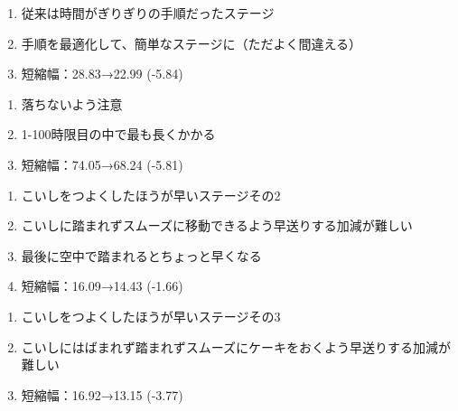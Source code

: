 \begin{enumerate}[label={\sarrow}]
\item 従来は時間がぎりぎりの手順だったステージ
\item 手順を最適化して、簡単なステージに（ただよく間違える）
\item 短縮幅：28.83→22.99 (-5.84)
\end{enumerate}



\begin{enumerate}[label={\sarrow}]
\item 落ちないよう注意
\item 1-100時限目の中で最も長くかかる
\item 短縮幅：74.05→68.24 (-5.81)
\end{enumerate}



\begin{enumerate}[label={\sarrow}]
\item こいしをつよくしたほうが早いステージその2
\item こいしに踏まれずスムーズに移動できるよう早送りする加減が難しい
\item 最後に空中で踏まれるとちょっと早くなる
\item 短縮幅：16.09→14.43 (-1.66)
\end{enumerate}



\begin{enumerate}[label={\sarrow}]
\item こいしをつよくしたほうが早いステージその3
\item こいしにはばまれず踏まれずスムーズにケーキをおくよう早送りする加減が難しい
\item 短縮幅：16.92→13.15 (-3.77)
\end{enumerate}





